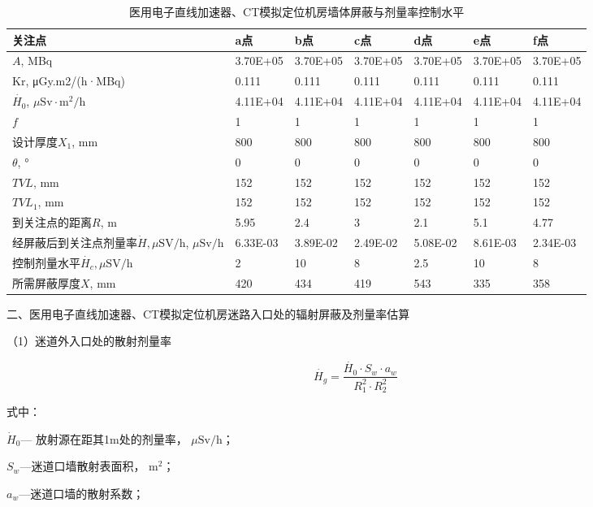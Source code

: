 \begin{table}[H]
\centering
\caption{医用电子直线加速器、CT模拟定位机房墙体屏蔽与剂量率控制水平}
\label{tab:ch4-wall-dose}
\begin{tabular}{|m{4cm}|m{1.6cm}|m{1.6cm}|m{1.6cm}|m{1.6cm}|m{1.6cm}|m{1.6cm}|}
\hline
关注点 & a点 & b点 & c点 & d点 & e点 & f点 \\
\hline
$A$, MBq & 3.70E+05 & 3.70E+05 & 3.70E+05 & 3.70E+05 & 3.70E+05 & 3.70E+05 \\
\hline
Kr, μGy.m2/(h·MBq) & 0.111 & 0.111 & 0.111 & 0.111 & 0.111 & 0.111 \\
\hline
$\dot{H_0}$, $\mu\mathrm{Sv\cdot m^2/h}$ & 4.11E+04 & 4.11E+04 & 4.11E+04 & 4.11E+04 & 4.11E+04 & 4.11E+04 \\
\hline
$f$ & 1 & 1 & 1 & 1 & 1 & 1 \\
\hline
设计厚度$X_1$, mm & 800 & 800 & 800 & 800 & 800 & 800 \\
\hline
$\theta$, ° & 0 & 0 & 0 & 0 & 0 & 0 \\
\hline
$TVL$, mm & 152 & 152 & 152 & 152 & 152 & 152 \\
\hline
$TVL_1$, mm & 152 & 152 & 152 & 152 & 152 & 152 \\
\hline
到关注点的距离$R$, m & 5.95 & 2.4 & 3 & 2.1 & 5.1 & 4.77 \\
\hline
经屏蔽后到关注点剂量率$\dot{H},\mu\mathrm{SV/h}$, $\mu\mathrm{Sv/h}$ & 6.33E-03 & 3.89E-02 & 2.49E-02 & 5.08E-02 & 8.61E-03 & 2.34E-03 \\
\hline
控制剂量水平$\dot{H_c},\mu\mathrm{SV/h}$ & 2 & 10 & 8 & 2.5 & 10 & 8 \\
\hline
所需屏蔽厚度$X$, mm & 420 & 434 & 419 & 543 & 335 & 358 \\
\hline
\end{tabular}
\end{table}


二、医用电子直线加速器、CT模拟定位机房迷路入口处的辐射屏蔽及剂量率估算

（1）迷道外入口处的散射剂量率

\begin{equation}
    \dot{H_g}=\dfrac{\dot{H_0}\cdot S_w\cdot a_w}{R_1^2\cdot R^2_2}
\end{equation}

式中：

$\dot { H } _ {0}$— 放射源在距其1m处的剂量率， $\mu \mathrm { S v / h }$；

$S _ { w }$—迷道口墙散射表面积， $\mathrm { m } ^ { 2 }$；

$a _ { w }$—迷道口墙的散射系数；


